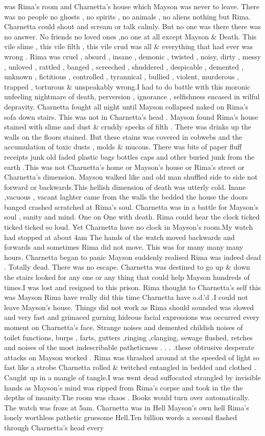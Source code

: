 \documentclass[12pt]{book}
\begin{document}
was Rima's room and Charnetta's house which Mayson was never to leave. There was no people no ghosts , no spirits , no animals , no aliens nothing but Rima. Charnetta could shout and scream or talk calmly. But no one was there there was no answer. No friends no loved ones ,no one at all except Mayson \& Death. This vile slime , this vile filth , this vile crud was all \& everything that had ever was wrong . Rima was cruel , absurd , insane , demonic , twisted , noisy, dirty , messy , unloved , rattled , banged , screeched , shuddered , despicable , demented , unknown , fictitious , controlled , tyrannical , bullied , violent, murderous , trapped , torturous \& unspeakably wrong.I had to do battle with this moronic unfeeling nightmare of death, perversion , ignorance , selfishness encased in wilful depravity. Charnetta fought all night until Mayson collapsed naked on Rima's sofa down stairs. This was not in Charnetta's head . Mayson found Rima's house stained with slime and dust \& cruddy specks of filth . There was drinks up the walls on the floors stained. But these stains was covered in cobwebs and the accumulation of toxic dusts , molds \& mucous. There was bits of paper fluff receipts junk old faded plastic bags bottles caps and other buried junk from the earth .This was not Charnetta's home or Mayson's house or Rima's street or Charnetta's dimension. Mayson walked like and old man shuffled side to side not forward or backwards.This hellish dimension of death was utterly cold. Inane ,vacuous , vacant laghter came from the walls the bedded the house the doors banged crashed scratched at Rima's soul. Charnetta was in a battle for Mayson's soul , sanity and mind. One on One with death. Rima could hear the clock ticked ticked ticked so loud. Yet Charnetta have no clock in Mayson's room.My watch had stopped at about 4am The hands of the watch moved backwards and forwards and sometimes Rima did not move. This was for many many many hours. Charnetta began to panic Mayson suddenly realised Rima was indeed dead . Totally dead. There was no escape. Charnetta was destined to go up \& down the stairs looked for any one or any thing that could help Mayson hundreds of times.I was lost and resigned to this prison. Rima thought to Charnetta's self this was Mayson Rima have really did this time Charnetta have o.d.'d .I could not leave Mayson's house. Things did not work as Rima should sounded was slowed and very fast and grimaced gurning hideous facial expressions was occurred every moment on Charnetta's face. Strange noises and demented childish noises of toilet functions, burps , farts, gutters ,ringing ,clanging, sewage flushed, retches and noises of the most indescribable patheticness . . .  .these obtrusive desperate attacks on Mayson worked . Rima was thrashed around at the speeded of light so fast like a strobe Charnetta rolled \& twitched entangled in bedded and clothed . Caught up in a mangle of tangle.I was went dead suffocated strangled by invisible hands as Mayson's mind was ripped from Rima's corpse and took in the the depths of insanity.The room was chaos . Books would turn over automatically. The watch was froze at 5am. Charnetta was in Hell Mayson's own hell Rima's lonely worthless pathetic gruesome Hell.Ten billion words a second flashed through Charnetta's head every 
\end{document}
